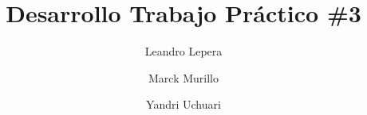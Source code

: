 \documentclass{article} %
\begin{document}
\title{Desarrollo Trabajo Práctico \#3}
\author{
    Leandro Lepera \newline
    \and
    Marck Murillo \\
    \and
    Yandri Uchuari \\
}
\maketitle





\end{document}
